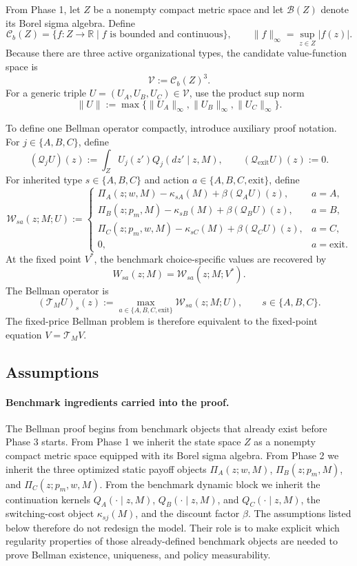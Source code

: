 From Phase 1, let $Z$ be a nonempty compact metric space and let $\mathcal B(Z)$ denote its Borel sigma algebra. Define
\[
\mathcal C_b(Z)=\{f:Z\to\mathbb R\mid f\text{ is bounded and continuous}\},
\qquad
\|f\|_\infty=\sup_{z\in Z}|f(z)|.
\]
Because there are three active organizational types, the candidate value-function space is
\[
\mathcal V:=\mathcal C_b(Z)^3.
\]
For a generic triple $U=(U_A,U_B,U_C)\in\mathcal V$, use the product sup norm
\[
\|U\|:=\max\{\|U_A\|_\infty,\|U_B\|_\infty,\|U_C\|_\infty\}.
\]

To define one Bellman operator compactly, introduce auxiliary proof notation. For $j\in\{A,B,C\}$, define
\[
(\mathcal Q_jU)(z):=\int_Z U_j(z')Q_j(dz'\mid z,M),
\qquad
(\mathcal Q_{\mathrm{exit}}U)(z):=0.
\]
For inherited type $s\in\{A,B,C\}$ and action $a\in\{A,B,C,\mathrm{exit}\}$, define
\[
\mathcal W_{sa}(z;M;U):=
\begin{cases}
\Pi_A(z;w,M)-\kappa_{sA}(M)+\beta(\mathcal Q_AU)(z), & a=A,\\
\Pi_B(z;p_m,M)-\kappa_{sB}(M)+\beta(\mathcal Q_BU)(z), & a=B,\\
\Pi_C(z;p_m,w,M)-\kappa_{sC}(M)+\beta(\mathcal Q_CU)(z), & a=C,\\
0, & a=\mathrm{exit}.
\end{cases}
\]
At the fixed point $V^*$, the benchmark choice-specific values are recovered by
\[
W_{sa}(z;M)=\mathcal W_{sa}(z;M;V^*).
\]
The Bellman operator is
\[
(\mathcal T_MU)_s(z):=\max_{a\in\{A,B,C,\mathrm{exit}\}}\mathcal W_{sa}(z;M;U),
\qquad s\in\{A,B,C\}.
\]
The fixed-price Bellman problem is therefore equivalent to the fixed-point equation $V=\mathcal T_MV$.

\subsection{Assumptions}

\paragraph{Benchmark ingredients carried into the proof.}
The Bellman proof begins from benchmark objects that already exist before Phase 3 starts. From Phase 1 we inherit the state space $Z$ as a nonempty compact metric space equipped with its Borel sigma algebra. From Phase 2 we inherit the three optimized static payoff objects $\Pi_A(z;w,M)$, $\Pi_B(z;p_m,M)$, and $\Pi_C(z;p_m,w,M)$. From the benchmark dynamic block we inherit the continuation kernels $Q_A(\cdot\mid z,M)$, $Q_B(\cdot\mid z,M)$, and $Q_C(\cdot\mid z,M)$, the switching-cost object $\kappa_{sj}(M)$, and the discount factor $\beta$. The assumptions listed below therefore do not redesign the model. Their role is to make explicit which regularity properties of those already-defined benchmark objects are needed to prove Bellman existence, uniqueness, and policy measurability.

